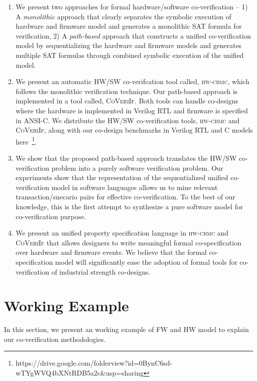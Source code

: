 \documentclass[sigconf]{acmart}
\newcommand{\tool}[1]{\textsc{#1}\xspace}
\newcommand{\hwcbmcv}{\tool{hw-cbmc}}
\newcommand{\verifox}{\tool{CoVeriIf}}
\begin{document}
\begin{enumerate}
  
  \item We present two approaches for formal hardware/software co-verification
    -- 1) A \emph{monolithic} approach that clearly separates the symbolic
    execution of hardware and firmware model and generates a monolithic SAT
    formula for verification, 2) A \emph{path-based} approach that constructs a
    unified co-verification model by sequentializing the hardware and firmware
    models and generates multiple SAT formulas through combined symbolic
    execution of the unified model. 
  
  \item We present an automatic HW/SW co-verifcation tool called, \hwcbmcv,
    which follows the monolithic verification technique.  Our path-based 
    approach is implemented in a tool called, \verifox. Both tools can handle
    co-designs where the hardware is implemented in Verilog RTL and firmware is  
    specified in ANSI-C.  We distribute the HW/SW co-verification tools, \hwcbmcv and 
    \verifox, along with our co-design benchmarks in Verilog RTL and C models
here~\footnote{https://drive.google.com/folderview?id=0BynC6sd-wTYgWVQ4bXNtRDB5a2c\&usp=sharing}. 

  \item We show that the proposed path-based approach translates the HW/SW co-verification problem
     into a purely software verification problem.  Our experiments show that the representation
     of the sequentialized unified co-verification model in software languages allows us to 
     mine relevant transaction/snecario pairs for effective co-verification.  To the 
     best of our knowledge, this is the first attempt to synthesize a pure
     software model for co-verification purpose.  

   \item We present an unified property specification language in \hwcbmcv and 
     \verifox that allows designers to write meaningful formal co-specification 
     over hardware and firmware events. We believe that the formal
     co-specification model will significantly ease the adoption of formal tools 
     for co-verification of industrial strength co-designs. 
    
\end{enumerate}
%
\section{Working Example}
In this section, we present an working example of FW and HW model to explain our 
co-verification methodologies.  
\end{document}
